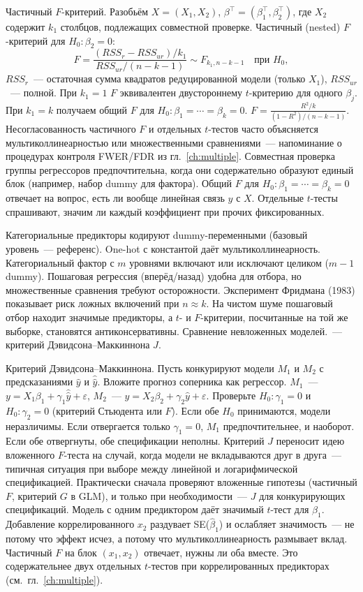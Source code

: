 Частичный $F$-критерий. Разобьём $X=(X_1,X_2)$, $\beta^\top=(\beta_1^\top,\beta_2^\top)$, где $X_2$ содержит $k_1$ столбцов, подлежащих совместной проверке.
Частичный (nested) $F$-критерий для $H_0\colon\beta_2=0$:
\[ F=\frac{(RSS_r-RSS_{ur})/k_1}{RSS_{ur}/(n-k-1)} \sim F_{k_1,n-k-1}\quad\text{при }H_0, \]
$RSS_r$~--- остаточная сумма квадратов редуцированной модели (только $X_1$), $RSS_{ur}$~--- полной.
При $k_1=1$ $F$ эквивалентен двустороннему $t$-критерию для одного $\beta_j$.
При $k_1=k$ получаем общий $F$ для $H_0\colon\beta_1=\cdots=\beta_k=0$. $F=\frac{R^2/k}{(1-R^2)/(n-k-1)}$.
Несогласованность частичного $F$ и отдельных $t$-тестов часто объясняется мультиколлинеарностью или множественными сравнениями~--- напоминание о процедурах контроля FWER/FDR из гл.~\ref{ch:multiple}.
Совместная проверка группы регрессоров предпочтительна, когда они содержательно образуют единый блок (например, набор dummy для фактора).
Общий $F$ для $H_0\colon\beta_1=\cdots=\beta_k=0$ отвечает на вопрос, есть ли вообще линейная связь $y$ с $X$. Отдельные $t$-тесты спрашивают, значим ли каждый коэффициент при прочих фиксированных.

Категориальные предикторы кодируют dummy-переменными (базовый уровень~--- референс). One-hot с константой даёт мультиколлинеарность.
Категориальный фактор с $m$ уровнями включают или исключают целиком ($m-1$ dummy).
Пошаговая регрессия (вперёд/назад) удобна для отбора, но множественные сравнения требуют осторожности. Эксперимент Фридмана (1983) показывает риск ложных включений при $n\approx k$. На чистом шуме пошаговый отбор находит значимые предикторы, а $t$- и $F$-критерии, посчитанные на той же выборке, становятся антиконсервативны.
Сравнение невложенных моделей.~--- критерий Дэвидсона--Маккиннона $J$.

Критерий Дэвидсона--Маккиннона. Пусть конкурируют модели $M_1$ и $M_2$ с предсказаниями $\hat y$ и $\hat{\hat y}$.
Вложите прогноз соперника как регрессор. $M_1$~--- $y=X_1\beta_1+\gamma_1\hat{\hat y}+\varepsilon$, $M_2$~--- $y=X_2\beta_2+\gamma_2\hat y+\varepsilon$.
Проверьте $H_0\colon\gamma_1=0$ и $H_0\colon\gamma_2=0$ (критерий Стьюдента или $F$).
Если обе $H_0$ принимаются, модели неразличимы. Если отвергается только $\gamma_1=0$, $M_1$ предпочтительнее, и наоборот. Если обе отвергнуты, обе спецификации неполны.
Критерий $J$ переносит идею вложенного $F$-теста на случай, когда модели не вкладываются друг в друга~--- типичная ситуация при выборе между линейной и логарифмической спецификацией.
Практически сначала проверяют вложенные гипотезы (частичный $F$, критерий $G$ в GLM), и только при необходимости~--- $J$ для конкурирующих спецификаций.
Модель с одним предиктором даёт значимый $t$-тест для $\beta_1$. Добавление коррелированного $x_2$ раздувает SE($\hat\beta_1$) и ослабляет значимость~--- не потому что эффект исчез, а потому что мультиколлинеарность размывает вклад. Частичный $F$ на блок $(x_1,x_2)$ отвечает, нужны ли оба вместе. Это содержательнее двух отдельных $t$-тестов при коррелированных предикторах (см.~гл.~\ref{ch:multiple}).

